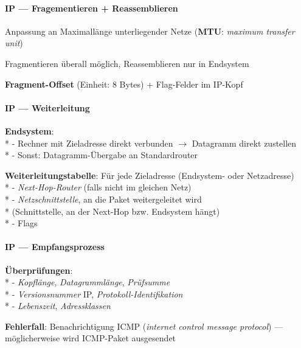 \paragraph{IP --- Fragementieren + Reassemblieren}
\begin{items}
  \item Anpassung an Maximallänge unterliegender Netze (\textbf{MTU}: \emph{maximum transfer unit})
  \item Fragmentieren überall möglich, Reassemblieren nur in Endsystem
  \item \textbf{Fragment-Offset} (Einheit: 8 Bytes) + Flag-Felder im IP-Kopf %
\end{items}

\paragraph{IP --- Weiterleitung}
\begin{items}
  \item \textbf{Endsystem}: \\*
    - Rechner mit Zieladresse direkt verbunden \( \to \) Datagramm direkt zustellen \\*
    - Sonst: Datagramm-Übergabe an Standardrouter
    \smallskip
  \item \textbf{Weiterleitungstabelle}: Für jede Zieladresse (Endsystem- oder Netzadresse) \\*
    - \emph{Next-Hop-Router} (falls nicht im gleichen Netz) \\*
    - \emph{Netzschnittstelle}, an die Paket weitergeleitet wird \\*
    	(Schnittstelle, an der Next-Hop bzw. Endsystem hängt)\\*
    - Flags
\end{items}

\paragraph{IP --- Empfangsprozess}
\begin{items}
  \item \textbf{Überprüfungen}: \\* 
    - \emph{Kopflänge}, \emph{Datagrammlänge}, \emph{Prüfsumme} \\*
    - \emph{Versionsnummer} IP, \emph{Protokoll-Identifikation} \\*
    - \emph{Lebenszeit}, \emph{Adressklassen}
    \smallskip
  \item \textbf{Fehlerfall}: Benachrichtigung ICMP (\emph{internet control message protocol}) --- möglicherweise wird ICMP-Paket ausgesendet
\end{items}

